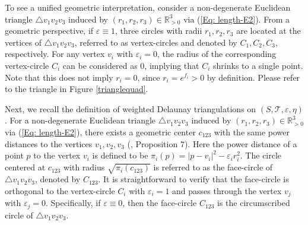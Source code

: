 \documentclass[12pt]{amsart}
\theoremstyle{definition}
\begin{document}
To see a unified geometric interpretation,
consider a non-degenerate Euclidean triangle $\triangle v_1v_2v_3$ induced by $(r_1,r_2,r_3)\in\mathbb{R}^3_{>0}$ via (\ref{Eq: length-E2}).
From a geometric perspective, if $\varepsilon\equiv1$, three circles with radii $r_1,r_2,r_3$ are located at the vertices of $\triangle v_1v_2v_3$, referred to as vertex-circles and denoted by $C_1,C_2,C_3$, respectively.
For any vertex $v_i$ with $\varepsilon_i=0$, the radius of the corresponding vertex-circle $C_i$ can be considered as $0$, implying that $C_i$ shrinks to a single point.  Note that this does not imply $r_i=0$, since $r_i=e^{f_i}>0$ by definition. Please refer to the triangle in Figure \ref{trianglequad}.



Next, we recall the definition of weighted Delaunay triangulations on $(S, \mathcal{T}, \varepsilon, \eta)$.
For a non-degenerate Euclidean triangle $\triangle v_1v_2v_3$  induced by $(r_1,r_2,r_3)\in\mathbb{R}^3_{>0}$ via (\ref{Eq: length-E2}), there exists a geometric center $c_{123}$ with the same power distances to the vertices $v_1,v_2,v_3$ (\cite{Glickenstein}, Proposition 7).
Here the power distance of a point $p$ to the vertex $v_i$ is defined to be $\pi_i(p)=|p-v_i|^2-\varepsilon_ir_i^2$.
The circle centered at $c_{123}$ with radius $\sqrt{\pi_i(c_{123})}$ is referred to as the face-circle of $\triangle v_1v_2v_3$, denoted by $C_{123}$.
It is straightforward to verify that the face-circle is orthogonal to the vertex-circle $C_i$ with $\varepsilon_i=1$ and passes through the vertex $v_j$ with $\varepsilon_j=0$.
Specifically, if $\varepsilon\equiv0$, then the face-circle $C_{123}$ is the circumscribed circle of $\triangle v_1v_2v_3$.
\end{document}
